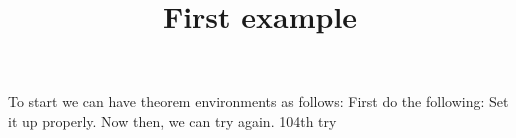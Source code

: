 \documentclass{ximera}
\title{First example}
\begin{document}
\maketitle

To start we can have theorem environments as follows:
First do the following:
Set it up properly.
Now then, we can try again.
104th try
\end{document}
